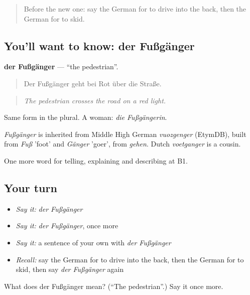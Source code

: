 \label{lesson:GE-C410-fussgaenger}



\begin{quote}
Before the new one: say the German for to drive into the back, then the German for to skid.
\end{quote}

\subsection*{You'll want to know: der Fußgänger}
\textbf{der Fußgänger} — \textquotedblleft{}the pedestrian\textquotedblright{}.

\begin{quote}
Der Fußgänger geht bei Rot über die Straße.
\end{quote}

\begin{quote}
\emph{The pedestrian crosses the road on a red light.}
\end{quote}

Same form in the plural. A woman: \emph{die Fußgängerin}.

\begin{cousinweb}
\emph{Fußgänger} is inherited from Middle High German \emph{vuozgenger} (EtymDB), built from \emph{Fuß} 'foot' and \emph{Gänger} 'goer', from \emph{gehen}. Dutch \emph{voetganger} is a cousin.
\end{cousinweb}

\begin{grammarlens}[title={What you've built}]
One more word for telling, explaining and describing at B1.
\end{grammarlens}

\subsection*{Your turn}
\begin{itemize}
\raggedright
  \item \emph{Say it:} \emph{der Fußgänger}
  \item \emph{Say it:} \emph{der Fußgänger}, once more
  \item \emph{Say it:} a sentence of your own with \emph{der Fußgänger}
  \item \emph{Recall:} say the German for to drive into the back, then the German for to skid, then say \emph{der Fußgänger} again
\end{itemize}

\begin{tcolorbox}[breakable,colback=teal!4,colframe=teal!35!black,title={Before you move on}]
What does der Fußgänger mean? (\textquotedblleft{}The pedestrian\textquotedblright{}.) Say it once more.
\end{tcolorbox}
